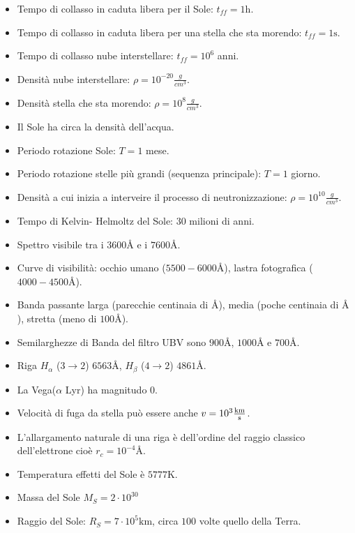 \documentclass[11pt,a4paper]{article}
\begin{document}
\begin{itemize}
\item Tempo di collasso in caduta libera per il Sole: $t_{ff} = 1$h.
\item Tempo di collasso in caduta libera per una stella che sta morendo: $t_{ff} = 1 \si{\second}$.
\item Tempo di collasso nube interstellare: $t_{ff} = 10^{6}$ anni.
\item Densità nube interstellare: $\rho = 10^{-20} \frac{g}{cm^{3}}$.
\item Densità stella che sta morendo: $\rho = 10^{8} \frac{g}{cm^{3}}$.
\item Il Sole ha circa la densità dell'acqua.
\item Periodo rotazione Sole: $T = 1$ mese.
\item Periodo rotazione stelle più grandi (sequenza principale): $T = 1$ giorno.
\item Densità a cui inizia a interveire il processo di neutronizzazione: $\rho = 10^{10}\frac{g}{cm^{3}}$.
\item Tempo di Kelvin- Helmoltz del Sole: $30$ milioni di anni.
\item Spettro visibile tra i $3600 \si{\angstrom}$ e i $7600 \si{\angstrom}$.
\item Curve di visibilità: occhio umano ($5500-6000 \si{\angstrom}$), lastra fotografica ($4000-4500 \si{\angstrom}$).
\item Banda passante larga (parecchie centinaia di $\si{\angstrom}$), media (poche centinaia di $\si{\angstrom}$), stretta (meno di $100 \si{\angstrom}$).
\item Semilarghezze di Banda del filtro UBV sono $900 \si{\angstrom}$, $1000 \si{\angstrom}$ e $700 \si{\angstrom}$.
\item Riga $H_{\alpha}$ ($3 \rightarrow 2$) $6563 \si{\angstrom}$, $H_\beta$ ($4 \rightarrow 2$) $4861 \si{\angstrom}$.
\item La Vega($\alpha$ Lyr) ha magnitudo $0$.
\item Velocità di fuga da stella può essere anche $v = 10^{3} \si{\frac{k \meter}{\second}}$.
\item L'allargamento naturale di una riga è dell'ordine del raggio classico dell'elettrone cioè $r_c = 10^{-4} \si{\angstrom}$.
\item Temperatura effetti del Sole è $5777 \si{\kelvin}$.
\item Massa del Sole $M_S = 2 \cdot 10^{30}$
\item Raggio del Sole: $R_S = 7 \cdot 10^5 \si{\kilo \meter}$, circa $100$ volte quello della Terra.

\end{itemize}
\end{document}
